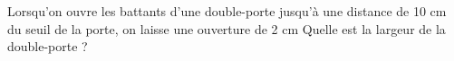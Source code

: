 \documentclass[exercice]{thedocument}%
\begin{document}
%
Lorsqu'on ouvre les battants d'une double-porte jusqu'à une distance de 10 cm du
seuil de la porte, on laisse une ouverture
de 2 cm\vskip20pt
Quelle est la largeur de la double-porte ?
\end{document}
